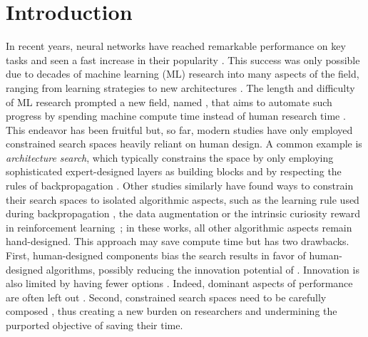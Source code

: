 \section{Introduction}
\label{intro_sec}

In recent years, neural networks have reached remarkable performance on key tasks and seen a fast increase in their popularity . This success was only possible due to decades of machine learning (ML) research into many aspects of the field, ranging from learning strategies to new architectures . The length and difficulty of ML research prompted a new field, named \textit{\aml}, that aims to automate such progress by spending machine compute time instead of human research time \cite{fahlman1990cascade,hutter2011sequential,finn2017model}. This endeavor has been fruitful but, so far, modern studies have only employed constrained search spaces heavily reliant on human design. A common example is \textit{architecture search}, which typically constrains the space by only employing sophisticated expert-designed layers as building blocks and by respecting the rules of backpropagation \cite{zoph2016neural,real2017large,tan2019mnasnet}. Other \aml studies similarly have found ways to constrain their search spaces to isolated algorithmic aspects, such as the learning rule used during backpropagation \cite{andrychowicz2016learning,ravi2016optimization}, the data augmentation \cite{cubuk2018autoaugment,park2019specaugment} or the intrinsic curiosity reward in reinforcement learning~\cite{alet2019meta}; in these works, all other algorithmic aspects remain hand-designed. This approach may save compute time but has two drawbacks. First, human-designed components bias the search results in favor of human-designed algorithms, possibly reducing the innovation potential of \aml. Innovation is also limited by having fewer options \cite{elsken2019neural}. Indeed, dominant aspects of performance are often left out \cite{yang2019evaluation}. Second, constrained search spaces need to be carefully composed \cite{zoph2017learning,So2019TheET,negrinho2019towards}, thus creating a new burden on researchers and undermining the purported objective of saving their time.

